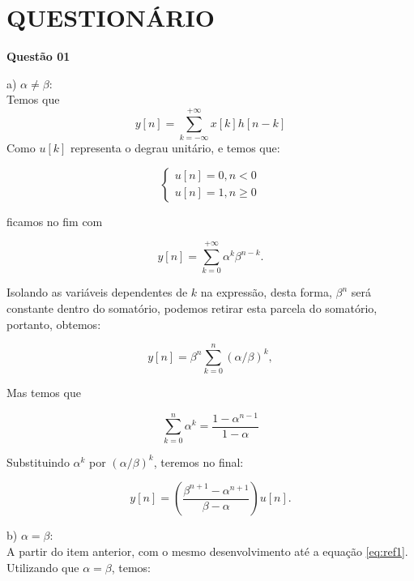 \newpage

\section{QUESTIONÁRIO}

\textbf{Questão 01} 

a) $\alpha \neq \beta$: \\

Temos que 
\begin{equation}
        y[n] = \sum ^{+\infty} _{k = -\infty} x[k]h[n - k] 
\end{equation}
Como $u[k]$ representa o degrau unitário, e temos que:

\begin{equation}
    \begin{cases}
     u[n] = 0, n < 0 \\
     u[n] = 1, n \geq 0 
    \end{cases} 
\end{equation}

ficamos no fim com

\begin{equation}\label{eq:ref1}
    y[n] = \sum ^{+\infty} _{k = 0} \alpha^k \beta^{n-k}.
\end{equation}

Isolando as variáveis dependentes de $k$ na expressão, desta forma, 
$\beta^n$ será constante dentro do somatório, podemos retirar esta parcela do 
somatório, portanto, obtemos:

\begin{equation}
    y[n] = \beta^n \sum _{k = 0} ^{n} (\alpha/\beta)^k,
\end{equation}

Mas temos que 

\begin{equation}
    \sum ^{n} _{k=0} \alpha ^k = \frac{1 - \alpha^{n-1}}{1 - \alpha}
\end{equation}

Substituindo $\alpha^k$ por $(\alpha/\beta)^k$, teremos no final:

\begin{equation}
    y[n] = \left( \frac{\beta^{n+1} - \alpha^{n+1}}{\beta - \alpha} \right)u[n].
\end{equation}

b) $\alpha = \beta$:\\

A partir do item anterior, com o mesmo desenvolvimento até a equação 
\ref{eq:ref1}. Utilizando que $\alpha = \beta$, temos:


